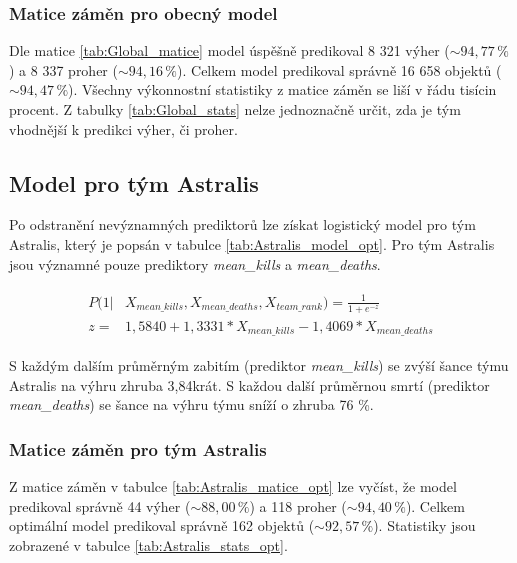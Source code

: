 \subsubsection{Matice záměn pro obecný model}





Dle matice \ref{tab:Global_matice} model úspěšně predikoval 8 321 výher ($\sim 94,77 \,\% $) a 8 337 proher ($\sim 94,16 \,\% $). Celkem
model predikoval správně 16 658 objektů ($\sim 94,47 \,\% $). Všechny výkonnostní statistiky z matice záměn se liší v řádu tisícin procent.
Z tabulky \ref{tab:Global_stats} nelze jednoznačně určit, zda je tým vhodnější k predikci výher, či proher.

\subsection{Model pro tým Astralis}



Po odstranění nevýznamných prediktorů lze získat logistický model pro tým Astralis, který je popsán v tabulce \ref{tab:Astralis_model_opt}. Pro tým Astralis jsou významné pouze prediktory
\textit{mean\_kills} a \textit{mean\_deaths}. 

\begin{align}
    \begin{split}
        P(1 | &X_{mean\_kills}, X_{mean\_deaths}, X_{team\_rank}) = \frac{1}{1 + e^{-z}} \\
        z =   &1,5840 + 1,3331*X_{mean\_kills} - 1,4069*X_{mean\_deaths}
    \end{split}
\end{align}

S každým dalším průměrným zabitím (prediktor \textit{mean\_kills}) se zvýší šance týmu Astralis na výhru zhruba 3,84krát. S každou další průměrnou smrtí
(prediktor \textit{mean\_deaths}) se šance na výhru týmu sníží o zhruba 76 \%.

\subsubsection{Matice záměn pro tým Astralis}





Z matice záměn v tabulce \ref{tab:Astralis_matice_opt} lze vyčíst, že model predikoval správně 44 výher ($\sim 88,00 \,\%$) a 118 proher ($\sim 94,40 \,\%$).
Celkem optimální model predikoval správně 162 objektů ($\sim 92,57 \,\%$). Statistiky jsou zobrazené v tabulce \ref{tab:Astralis_stats_opt}.

